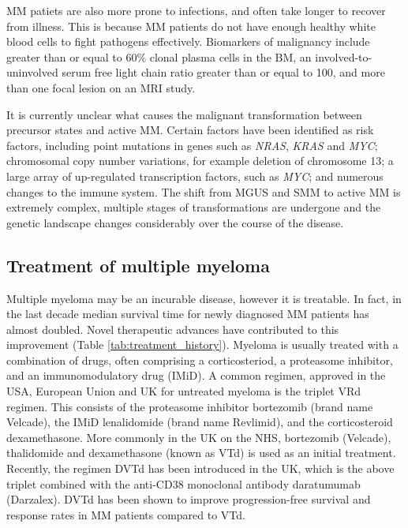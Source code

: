 \noindent
MM patiets are also more prone to infections, and often take longer to recover from illness.
This is because MM patients do not have enough healthy white blood cells to fight pathogens effectively.
Biomarkers of malignancy include greater than or equal to 60\% clonal plasma cells in the BM, an involved-to-uninvolved serum free light chain ratio greater than or equal to 100, and more than one focal lesion on an MRI study\cite{rajkumar2014international}.

It is currently unclear what causes the malignant transformation between precursor states and active MM\@.
Certain factors have been identified as risk factors, including point mutations in genes such as \textit{NRAS}, \textit{KRAS} and \textit{MYC}; chromosomal copy number variations, for example deletion of chromosome 13; a large array of up-regulated transcription factors, such as \textit{MYC}; and numerous changes to the immune system\cite{korde2011monoclonal, mccachren2021co}.
The shift from MGUS and SMM to active MM is extremely complex, multiple stages of transformations are undergone and the genetic landscape changes considerably over the course of the disease.

\subsection{Treatment of multiple myeloma}\label{subsec:mm_treatment}
Multiple myeloma may be an incurable disease, however it is treatable.
In fact, in the last decade median survival time for newly diagnosed MM patients has almost doubled\cite{kazandjian2016look}.
Novel therapeutic advances have contributed to this improvement (Table \ref{tab:treatment_history}).
Myeloma is usually treated with a combination of drugs, often comprising a corticosteriod, a proteasome inhibitor, and an immunomodulatory drug (IMiD).
A common regimen, approved in the USA, European Union and UK for untreated myeloma is the triplet VRd regimen.
This consists of the proteasome inhibitor bortezomib (brand name Velcade), the IMiD lenalidomide (brand name Revlimid), and the corticosteroid dexamethasone.
More commonly in the UK on the NHS, bortezomib (Velcade), thalidomide and dexamethasone (known as VTd) is used as an initial treatment.
Recently, the regimen DVTd has been introduced in the UK, which is the above triplet combined with the anti-CD38 monoclonal antibody daratumumab (Darzalex).
DVTd has been shown to improve progression-free survival and response rates in MM patients compared to VTd.

